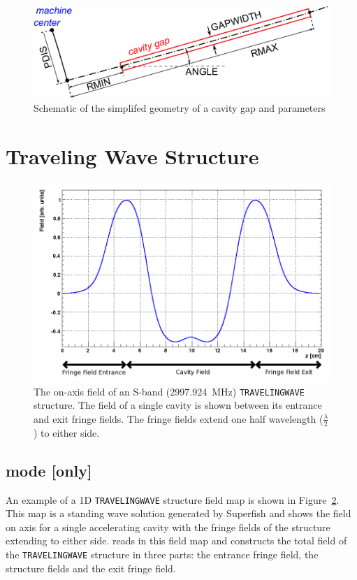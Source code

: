 \begin{figure}[hbt]
  \centering\includegraphics[scale=0.6]{./figures/cyclotron/Cavity.pdf}
  \caption{Schematic of the simplifed geometry of a cavity gap and parameters}
  \label{figure_Cyclotron_cavity}
\end{figure}


\section{Traveling Wave Structure}
\label{sec:travelingwave}

\begin{figure}[hbt]
  \centering\includegraphics[scale=0.6]{./figures/traveling-wave-structure/FINSB-RAC-field.png}
  \caption[The on-axis field of an S-band \texttt{TRAVELINGWAVE} structure]{The on-axis field of an S-band (2997.924~MHz) \texttt{TRAVELINGWAVE} structure.
    The field of a single cavity is shown between its entrance and exit fringe fields.
    The fringe fields extend one half wavelength ($\frac{\lambda}{2}$) to either side.}
  \label{figure_FINSB-RAC-field}
\end{figure}

\subsection{\opalt mode [only]}
An example of a 1D \texttt{TRAVELINGWAVE} structure field map is shown in Figure~\ref{figure_FINSB-RAC-field}.
This map is a standing wave solution generated by Superfish and shows the field on axis for a single accelerating cavity with
the fringe fields of the structure extending to either side. \opalt reads in this field map and constructs the total field of the
\texttt{TRAVELINGWAVE} structure in three parts: the entrance fringe field, the structure fields and the exit fringe field.

